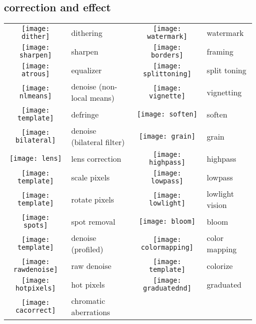 \documentclass[\ArgLang,\ArgFormat,9pt]{extarticle}
\begin{document}
\begin{multicols}{3}
  \subsection{correction and effect}

  \colorbox{keycol}{%
    \begin{tabularx}{\tabwidth}{clcl}
      \texttt{[image: dither]} & dithering                      & \texttt{[image: watermark]} & watermark \\
      \texttt{[image: sharpen]} & sharpen                       & \texttt{[image: borders]} & framing \\
      \texttt{[image: atrous]} & equalizer                      & \texttt{[image: splittoning]} & split toning \\
      \texttt{[image: nlmeans]} & denoise (non-local means)     & \texttt{[image: vignette]} & vignetting \\
      \texttt{[image: template]} & defringe                     & \texttt{[image: soften]} & soften \\
      \texttt{[image: bilateral]} & denoise (bilateral filter)  & \texttt{[image: grain]} & grain \\
      \texttt{[image: lens]} & lens correction                  & \texttt{[image: highpass]} & highpass \\
      \texttt{[image: template]} & scale pixels                 & \texttt{[image: lowpass]} & lowpass \\
      \texttt{[image: template]} & rotate pixels                & \texttt{[image: lowlight]} & lowlight vision \\
      \texttt{[image: spots]} & spot removal                    & \texttt{[image: bloom]} & bloom \\
      \texttt{[image: template]} & denoise (profiled)           & \texttt{[image: colormapping]} & color mapping \\
      \texttt{[image: rawdenoise]} & raw denoise                & \texttt{[image: template]} & colorize \\
      \texttt{[image: hotpixels]} & hot pixels                  & \texttt{[image: graduatednd]} & graduated \\
      \texttt{[image: cacorrect]} & chromatic aberrations
    \end{tabularx}}

\end{multicols}
\end{document}

